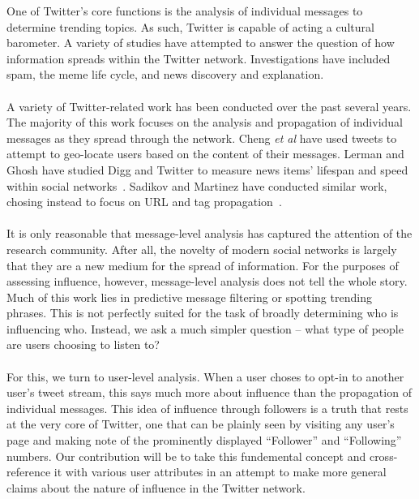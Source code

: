 One of Twitter's core functions is the analysis of individual messages to determine trending topics.  As such, Twitter is capable of acting a cultural barometer.  A variety of studies have attempted to answer the question of how information spreads within the Twitter network.  Investigations have included spam, the meme life cycle, and news discovery and explanation.\\\\
A variety of Twitter-related work has been conducted over the past several years.  The majority of this work focuses on the analysis and propagation of individual messages as they spread through the network.  Cheng \textit{et al} have used tweets to attempt to geo-locate users based on the content of their messages\cite{CCL10}.  Lerman and Ghosh have studied Digg and Twitter to measure news items' lifespan and speed within social networks~\cite{LG2010}.  Sadikov and Martinez have conducted similar work, chosing instead to focus on URL and tag propagation~\cite{SM0X}.\\\\
It is only reasonable that message-level analysis has captured the attention of the research community.  After all, the novelty of modern social networks is largely that they are a new medium for the spread of information.  For the purposes of assessing influence, however, message-level analysis does not tell the whole story.  Much of this work lies in predictive message filtering or spotting trending phrases.  This is not perfectly suited for the task of broadly determining who is influencing who.  Instead, we ask a much simpler question -- what type of people are users choosing to listen to?\\\\
For this, we turn to user-level analysis.  When a user choses to opt-in to another user's tweet stream, this says much more about influence than the propagation of individual messages.  This idea of influence through followers is a truth that rests at the very core of Twitter, one that can be plainly seen by visiting any user's page and making note of the prominently displayed ``Follower'' and ``Following'' numbers.  Our contribution will be to take this fundemental concept and cross-reference it with various user attributes in an attempt to make more general claims about the nature of influence in the Twitter network.\\\\